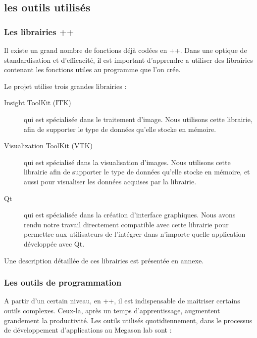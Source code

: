 \subsection{les outils utilisés}

\subsubsection{Les librairies \C++}
Il existe un grand nombre de fonctions déjà codées en {\C++}. Dans une optique de standardisation et d'efficacité, il est important d'apprendre a utiliser des librairies contenant les fonctions utiles au programme que l'on crée.

Le projet utilise trois grandes librairies :
\begin{description}
  \item[Insight ToolKit (ITK)] qui est spécialisée dans le traitement d'image. Nous utilisons cette librairie, 
  afin de supporter le type de données qu'elle stocke en mémoire.
  \item[Visualization ToolKit (VTK)] qui est spécialisé dans la visualisation d'images. 
  Nous utilisons cette librairie afin de supporter le type de données qu'elle stocke en mémoire,
  et aussi pour visualiser les données acquises par la librairie.
  \item[Qt] qui est spécialisée dans la création d'interface graphiques. 
  Nous avons rendu notre travail directement compatible avec cette librairie
  pour permettre aux utilisateurs de l'intégrer dans n'importe quelle application développée avec Qt.
\end{description}
Une description détaillée de ces librairies est présentée en annexe.


\subsubsection{Les outils de programmation}
A partir d'un certain niveau, en {\C++}, il est indispensable de maitriser certains outils complexes. Ceux-la, après un temps
 d'apprentissage, augmentent grandement la productivité.
Les outils utilisés quotidiennement, dans le processus de développement d'applications au Megason lab sont :

